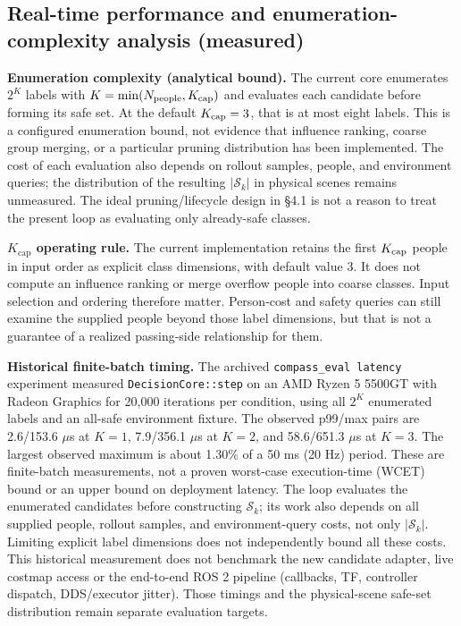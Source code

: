 \documentclass[11pt]{article}
\newcommand{\code}[1]{\texttt{#1}}
\begin{document}
\FloatBarrier
\subsection{Real-time performance and enumeration-complexity analysis (measured)}

\textbf{Enumeration complexity (analytical bound).} The current core enumerates $2^K$ labels with $K=\min(N_{\rm people},K_{\rm cap})$ and evaluates each candidate before forming its safe set. At the default $K_{\rm cap}=3$, that is at most eight labels. This is a configured enumeration bound, not evidence that influence ranking, coarse group merging, or a particular pruning distribution has been implemented. The cost of each evaluation also depends on rollout samples, people, and environment queries; the distribution of the resulting $|\mathcal{S}_k|$ in physical scenes remains unmeasured. The ideal pruning/lifecycle design in \S4.1 is not a reason to treat the present loop as evaluating only already-safe classes.

\textbf{$K_{\text{cap}}$ operating rule.} The current implementation retains the first $K_{\rm cap}$ people in input order as explicit class dimensions, with default value 3. It does not compute an influence ranking or merge overflow people into coarse classes. Input selection and ordering therefore matter. Person-cost and safety queries can still examine the supplied people beyond those label dimensions, but that is not a guarantee of a realized passing-side relationship for them.

\textbf{Historical finite-batch timing.} The archived \code{compass\_eval latency} experiment measured \code{DecisionCore::step} on an AMD Ryzen 5 5500GT with Radeon Graphics for 20,000 iterations per condition, using all $2^K$ enumerated labels and an all-safe environment fixture. The observed p99/max pairs are 2.6/153.6 $\mu$s at $K=1$, 7.9/356.1 $\mu$s at $K=2$, and 58.6/651.3 $\mu$s at $K=3$. The largest observed maximum is about 1.30\% of a 50 ms (20 Hz) period. These are finite-batch measurements, not a proven worst-case execution-time (WCET) bound or an upper bound on deployment latency. The loop evaluates the enumerated candidates before constructing $\mathcal{S}_k$; its work also depends on all supplied people, rollout samples, and environment-query costs, not only $|\mathcal{S}_k|$. Limiting explicit label dimensions does not independently bound all these costs. This historical measurement does not benchmark the new candidate adapter, live costmap access or the end-to-end ROS 2 pipeline (callbacks, TF, controller dispatch, DDS/executor jitter). Those timings and the physical-scene safe-set distribution remain separate evaluation targets.
\end{document}
